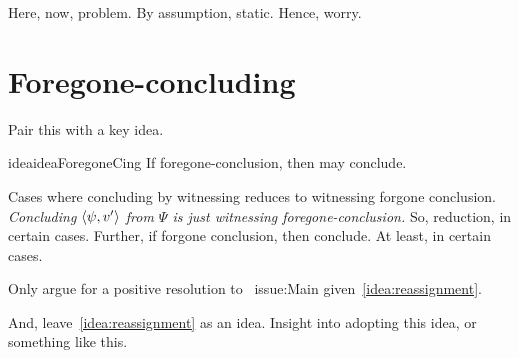 \begin{note}
  Here, now, problem.
  By assumption, static.
  Hence, worry.
\end{note}

\section{Foregone-concluding}

\begin{note}
  Pair this with a key idea.

  \begin{restatable}{idea}{ideaForegoneCing}
    \label{idea:reassignment}
    If foregone-conclusion, then may conclude.
  \end{restatable}

  Cases where concluding by witnessing reduces to witnessing forgone conclusion.
  \emph{Concluding \(\langle \psi, v' \rangle\) from \(\Psi\) is just witnessing foregone-conclusion.}
  So, reduction, in certain cases.
  Further, if forgone conclusion, then conclude.
  At least, in certain cases.
\end{note}

\begin{note}[???]
  Only argue for a positive resolution to~{\color{red} issue:Main} given~\autoref{idea:reassignment}.

  And, leave~\autoref{idea:reassignment} as an idea.
  Insight into adopting this idea, or something like this.
\end{note}

